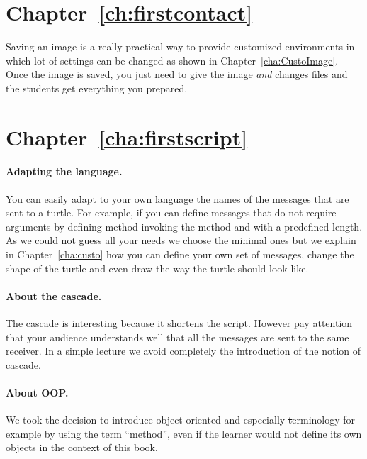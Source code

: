 \ifx\wholebook\relax\else



\fi

\section*{Chapter~\ref{ch:firstcontact}}

Saving an image  is a really practical way to provide customized environments in which lot of settings can be changed as shown in Chapter~\ref{cha:CustoImage}. Once the image is saved, you just need to give the  image \emph{and} changes files and the students get everything you prepared.



\section*{Chapter~\ref{cha:firstscript}}

\paragraph{Adapting the language.}
You can easily adapt to your own language the names of the messages that are sent to a turtle. For example, if you can define messages that do not require arguments by defining method invoking the method  and  with a predefined length. As we could not guess all your needs we choose the minimal ones but we explain in Chapter~\ref{cha:custo} how you can define your own set of messages, change the shape of the turtle and even draw the way the turtle should look like.


\paragraph{About the cascade.}
The cascade is interesting because it shortens the script. However pay attention that 
your audience understands well that all the messages are sent to the same receiver. 
In a simple  lecture we avoid completely the introduction of the notion of cascade. 

\paragraph{About OOP.}
We took the decision to introduce object-oriented and especially
\st terminology for example by using the term ``method'', even
if the learner would not define its own  objects in the context of this book.

